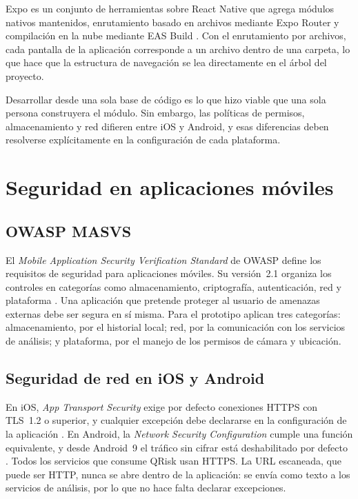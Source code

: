 Expo es un conjunto de herramientas sobre React Native que agrega módulos nativos mantenidos, enrutamiento basado en archivos mediante Expo Router \cite{expo_router} y compilación en la nube mediante EAS Build \cite{expo_eas}. Con el enrutamiento por archivos, cada pantalla de la aplicación corresponde a un archivo dentro de una carpeta, lo que hace que la estructura de navegación se lea directamente en el árbol del proyecto.

Desarrollar desde una sola base de código es lo que hizo viable que una sola persona construyera el módulo. Sin embargo, las políticas de permisos, almacenamiento y red difieren entre iOS y Android, y esas diferencias deben resolverse explícitamente en la configuración de cada plataforma.

\section{Seguridad en aplicaciones móviles}

\subsection{OWASP MASVS}

El \emph{Mobile Application Security Verification Standard} de OWASP define los requisitos de seguridad para aplicaciones móviles. Su versión~2.1 organiza los controles en categorías como almacenamiento, criptografía, autenticación, red y plataforma \cite{owasp2024masvs}. Una aplicación que pretende proteger al usuario de amenazas externas debe ser segura en sí misma. Para el prototipo aplican tres categorías: almacenamiento, por el historial local; red, por la comunicación con los servicios de análisis; y plataforma, por el manejo de los permisos de cámara y ubicación.

\subsection{Seguridad de red en iOS y Android}

En iOS, \emph{App Transport Security} exige por defecto conexiones HTTPS con TLS~1.2 o superior, y cualquier excepción debe declararse en la configuración de la aplicación \cite{apple_ats,apple2024platformsecurity}. En Android, la \emph{Network Security Configuration} cumple una función equivalente, y desde Android~9 el tráfico sin cifrar está deshabilitado por defecto \cite{android_netsecconfig}. Todos los servicios que consume QRisk usan HTTPS. La URL escaneada, que puede ser HTTP, nunca se abre dentro de la aplicación: se envía como texto a los servicios de análisis, por lo que no hace falta declarar excepciones.


